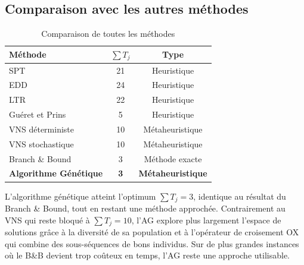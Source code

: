 \subsection{Comparaison avec les autres méthodes}

\begin{table}[H]
\centering
\begin{tabular}{lcc}
\toprule
\textbf{Méthode} & \textbf{$\sum T_j$} & \textbf{Type} \\
\midrule
SPT & 21 & Heuristique \\
EDD & 24 & Heuristique \\
LTR & 22 & Heuristique \\
Guéret et Prins & 5 & Heuristique \\
VNS déterministe & 10 & Métaheuristique \\
VNS stochastique & 10 & Métaheuristique \\
Branch \& Bound & 3 & Méthode exacte \\
\textbf{Algorithme Génétique} & \textbf{3} & \textbf{Métaheuristique} \\
\bottomrule
\end{tabular}
\caption{Comparaison de toutes les méthodes}
\end{table}

L'algorithme génétique atteint l'optimum $\sum T_j = 3$, identique au résultat du Branch \& Bound, tout en restant une méthode approchée. Contrairement au VNS qui reste bloqué à $\sum T_j = 10$, l'AG explore plus largement l'espace de solutions grâce à la diversité de sa population et à l'opérateur de croisement OX qui combine des sous-séquences de bons individus. Sur de plus grandes instances où le B\&B devient trop coûteux en temps, l'AG reste une approche utilisable.
